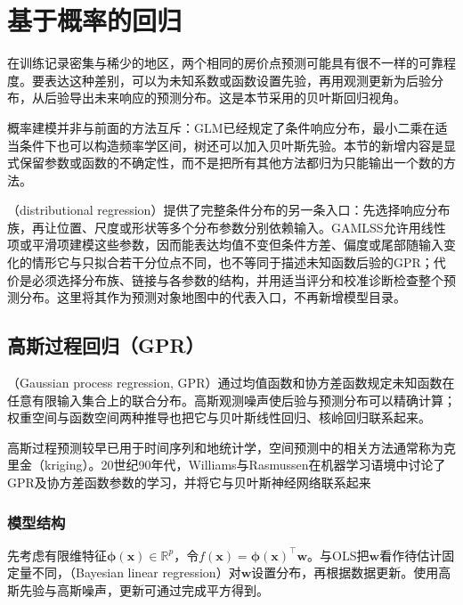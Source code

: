 \section{基于概率的回归}
\label{sec:regression-probabilistic}

在训练记录密集与稀少的地区，两个相同的房价点预测可能具有很不一样的可靠程度。要表达这种差别，可以为未知系数或函数设置先验，再用观测更新为后验分布，从后验导出未来响应的预测分布。这是本节采用的贝叶斯回归视角。

概率建模并非与前面的方法互斥：GLM已经规定了条件响应分布，最小二乘在适当条件下也可以构造频率学区间，树还可以加入贝叶斯先验。本节的新增内容是显式保留参数或函数的不确定性，而不是把所有其他方法都归为只能输出一个数的方法。

（distributional regression）提供了完整条件分布的另一条入口：先选择响应分布族，再让位置、尺度或形状等多个分布参数分别依赖输入。GAMLSS允许用线性项或平滑项建模这些参数，因而能表达均值不变但条件方差、偏度或尾部随输入变化的情形它与只拟合若干分位点不同，也不等同于描述未知函数后验的GPR；代价是必须选择分布族、链接与各参数的结构，并用适当评分和校准诊断检查整个预测分布。这里将其作为预测对象地图中的代表入口，不再新增模型目录。

\subsection{高斯过程回归（GPR）}
\label{sec:regression-gpr}

（Gaussian process regression, GPR）通过均值函数和协方差函数规定未知函数在任意有限输入集合上的联合分布。高斯观测噪声使后验与预测分布可以精确计算；权重空间与函数空间两种推导也把它与贝叶斯线性回归、核岭回归联系起来。

高斯过程预测较早已用于时间序列和地统计学，空间预测中的相关方法通常称为克里金（kriging）。20世纪90年代，Williams与Rasmussen在机器学习语境中讨论了GPR及协方差函数参数的学习，并将它与贝叶斯神经网络联系起来

\subsubsection{模型结构}
\label{sec:regression-gpr-structure}

先考虑有限维特征$\bm{\phi}(\bm{x})\in\mathbb{R}^{p}$，令$f(\bm{x})=\bm{\phi}(\bm{x})^{\top}\bm{w}$。与OLS把$\bm{w}$看作待估计固定量不同，（Bayesian linear regression）对$\bm{w}$设置分布，再根据数据更新。使用高斯先验与高斯噪声，更新可通过完成平方得到。

